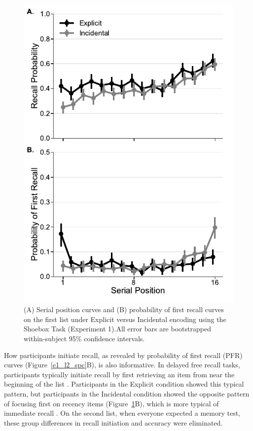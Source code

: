 \documentclass[man,natbib,floatsintext]{apa6} %
\begin{document}
\newcommand\spcpaneltext{All error bars are bootstrapped within-subject 95\% confidence intervals.}
\begin{figure}
\includegraphics{figures/E1_spc_list1.pdf}
\caption{(A) Serial position curves and (B) probability of first recall curves on the first list under Explicit versus Incidental encoding using the Shoebox Task (Experiment 1).\spcpaneltext}
\label{e1_l1_spc}
\end{figure}

How participants initiate recall, as revealed by probability of first recall (PFR) curves (Figure~\ref{e1_l2_spc}B), is also informative. In delayed free recall tasks, participants typically initiate recall by first retrieving an item from near the beginning of the list \citep[i.e., they focus first on primacy items;][]{HowaKaha99}. Participants in the Explicit condition showed this typical pattern, but participants in the Incidental condition showed the opposite pattern of focusing first on recency items (Figure~\ref{e1_l1_spc}B), which is more typical of immediate recall \citep{Hoga75}. On the second list, when everyone expected a memory test, these group differences in recall initiation and accuracy were eliminated.
\end{document}
